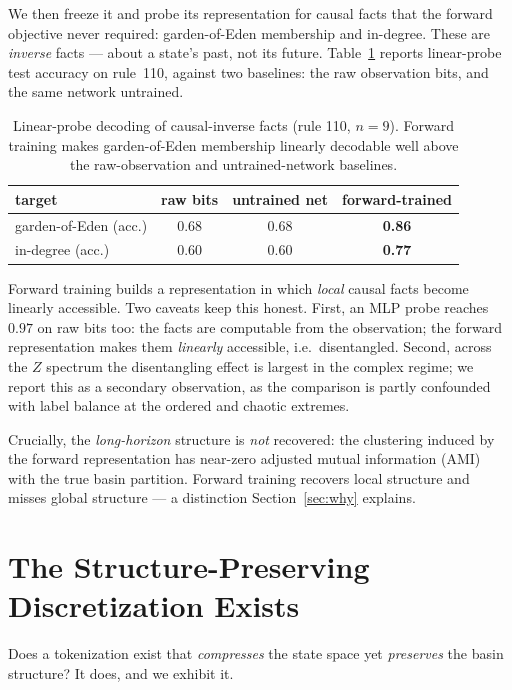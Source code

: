 \documentclass[11pt]{article}
\begin{document}
We then freeze it and probe its representation for causal facts that the
forward objective never required: garden-of-Eden membership and in-degree.
These are \emph{inverse} facts --- about a state's past, not its future.
Table~\ref{tab:probe} reports linear-probe test accuracy on rule~110, against
two baselines: the raw observation bits, and the same network untrained.

\begin{table}[h]
\centering
\caption{Linear-probe decoding of causal-inverse facts (rule 110, $n{=}9$).
Forward training makes garden-of-Eden membership linearly decodable well above
the raw-observation and untrained-network baselines.}
\label{tab:probe}
\begin{tabular}{lccc}
\toprule
target & raw bits & untrained net & forward-trained \\
\midrule
garden-of-Eden (acc.) & 0.68 & 0.68 & \textbf{0.86} \\
in-degree (acc.)      & 0.60 & 0.60 & \textbf{0.77} \\
\bottomrule
\end{tabular}
\end{table}

Forward training builds a representation in which \emph{local} causal facts
become linearly accessible. Two caveats keep this honest. First, an MLP probe
reaches $0.97$ on raw bits too: the facts are computable from the observation;
the forward representation makes them \emph{linearly} accessible, i.e.\
disentangled. Second, across the $Z$ spectrum the disentangling effect is
largest in the complex regime; we report this as a secondary observation, as
the comparison is partly confounded with label balance at the ordered and
chaotic extremes.

Crucially, the \emph{long-horizon} structure is \emph{not} recovered: the
clustering induced by the forward representation has near-zero adjusted mutual
information (AMI) with the true basin partition. Forward training recovers
local structure and misses global structure --- a distinction
Section~\ref{sec:why} explains.

\section{The Structure-Preserving Discretization Exists}
\label{sec:exists}

Does a tokenization exist that \emph{compresses} the state space yet
\emph{preserves} the basin structure? It does, and we exhibit it.
\end{document}
